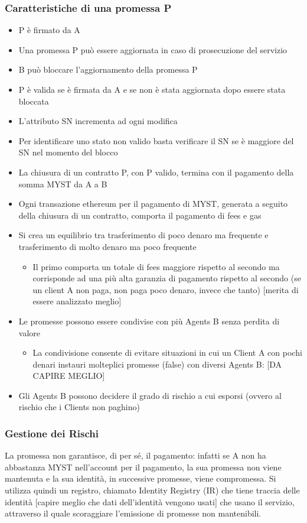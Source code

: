 \documentclass[]{article}
\begin{document}
	\subsubsection{Caratteristiche di una promessa P}
	\begin{itemize}
	\item P è firmato da A
	\item Una promessa P può essere aggiornata in caso di prosecuzione del servizio
	\item B può bloccare l’aggiornamento della promessa P
	\item P è valida se è firmata da A e se non è stata aggiornata dopo essere stata bloccata
	\item L’attributo SN incrementa ad ogni modifica
	\item Per identificare uno stato non valido basta verificare il SN se è maggiore del SN nel momento del blocco
	\item La chiusura di un contratto P, con P valido, termina con il pagamento della somma MYST da A a B
	\item Ogni transazione ethereum per il pagamento di MYST, generata a seguito della chiusura di un contratto, comporta il pagamento di fees e gas
	\item Si crea un equilibrio tra trasferimento di poco denaro ma frequente e trasferimento di molto denaro ma poco frequente
	\begin{itemize}
	\item Il primo comporta un totale di fees maggiore rispetto al secondo ma corrisponde ad una più alta garanzia di pagamento rispetto al secondo (se un client A non paga, non paga poco denaro, invece che tanto) [merita di essere analizzato meglio]
	\end{itemize}
	\item Le promesse possono essere condivise con più Agents B senza perdita di valore
	\begin{itemize}
	\item La condivisione consente di evitare situazioni in cui un Client A con pochi denari instauri molteplici promesse (false) con diversi Agents B: [DA CAPIRE MEGLIO]
	\end{itemize}
	\item Gli Agents B possono decidere il grado di rischio a cui esporsi (ovvero al rischio che i Clients non paghino)
	\end{itemize}	

	\subsubsection{Gestione dei Rischi}	
	La promessa non garantisce, di per sé, il pagamento: infatti se A non ha abbastanza MYST nell'account per il pagamento, la sua promessa non viene mantenuta e la sua identità, in successive promesse, viene compromessa.
	Si utilizza quindi un registro, chiamato Identity Registry (IR) che tiene traccia delle identità [capire meglio che dati dell’identità vengono usati] che usano il servizio, attraverso il quale scoraggiare l’emissione di promesse non mantenibili.
	
\end{document}
